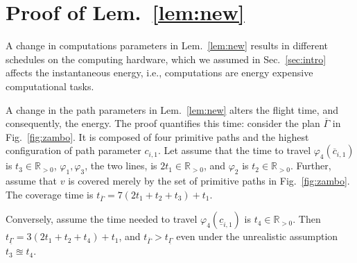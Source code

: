 \documentclass[letterpaper,10pt,journal,twoside]{IEEEtran}
\theoremstyle{definition}
\begin{document}
{%
}

\vspace*{-1ex}
\section{Proof of Lem.~\ref{lem:new}}
\label{app:proof-new}{\small

A change in computations parameters in Lem.~\ref{lem:new} results in different schedules on the computing hardware, which we assumed in Sec.~\ref{sec:intro} affects the instantaneous energy, i.e., computations are energy expensive computational tasks.

A change in the path parameters in Lem.~\ref{lem:new} alters the flight time, and consequently, the energy. The proof quantifies this time: consider the plan $\overline{\Gamma}$ in Fig.~\ref{fig:zambo}. It is composed of four primitive paths and the highest configuration of path parameter $c_{i,1}$. Let assume that the time to travel $\varphi_4(\overline{c}_{i,1})$ is $t_3\in\mathbb{R}_{>0}$, $\varphi_1,\varphi_3$, the two lines, is $2t_1\in\mathbb{R}_{>0}$, and $\varphi_2$ is $t_2\in\mathbb{R}_{>0}$. Further, assume that $v$ is covered merely by the set of primitive paths in Fig.~\ref{fig:zambo}. The coverage time is $t_{\overline{\Gamma}}=7(2t_1+t_2+t_3)+t_1$. 

Conversely, assume the time needed to travel $\varphi_4(\underline{c}_{i,1})$ is $t_4\in\mathbb{R}_{>0}$. Then $t_{\underline{\Gamma}}=3(2t_1+t_2+t_4)+t_1$, and $t_{\overline{\Gamma}}>t_{\underline{\Gamma}}$ even under the unrealistic assumption $t_3\approxeq t_4$.

}

\vspace*{-1ex}
\end{document}
